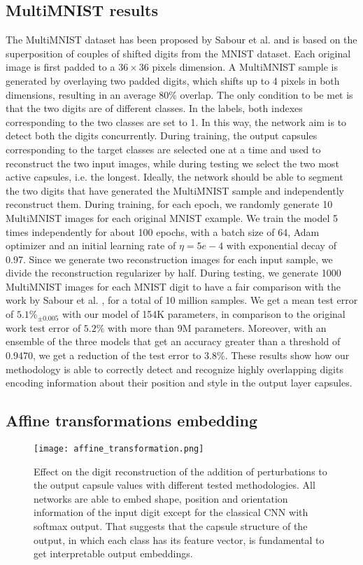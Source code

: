 \documentclass{article}
\begin{document}
\subsection{MultiMNIST results}
The MultiMNIST dataset has been proposed by Sabour et al. \cite{sabour2017dynamic} and is based on the superposition of couples of shifted digits from the MNIST dataset. Each original image is first padded to a $36 \times 36$ pixels dimension. A MultiMNIST sample is generated by overlaying two padded digits, which shifts up to 4 pixels in both dimensions, resulting in an average 80\% overlap. The only condition to be met is that the two digits are of different classes. In the labels, both indexes corresponding to the two classes are set to 1. In this way, the network aim is to detect both the digits concurrently. During training, the output capsules corresponding to the target classes are selected one at a time and used to reconstruct the two input images, while during testing we select the two most active capsules, i.e. the longest. Ideally, the network should be able to segment the two digits that have generated the MultiMNIST sample and independently reconstruct them. During training, for each epoch, we randomly generate 10 MultiMNIST images for each original MNIST example. We train the model 5 times independently for about 100 epochs, with a batch size of 64, Adam optimizer and an initial learning rate of $\eta=5e-4$ with exponential decay of 0.97. Since we generate two reconstruction images for each input sample, we divide the reconstruction regularizer by half. During testing, we generate 1000 MultiMNIST images for each MNIST digit to have a fair comparison with the work by Sabour et al. \cite{sabour2017dynamic}, for a total of 10 million samples. We get a mean test error of $5.1\%_{\pm 0.005}$ with our model of 154K parameters, in comparison to the original work test error of $5.2\%$ with more than 9M parameters. Moreover, with an ensemble of the three models that get an accuracy greater than a threshold of 0.9470, we get a reduction of the test error to 3.8\%. These results show how our methodology is able to correctly detect and recognize highly overlapping digits encoding information about their position and style in the output layer capsules.


\subsection{Affine transformations embedding}
\begin{figure}[t]
    \centering
    \texttt{[image: affine\_transformation.png]}
    \caption{Effect on the digit reconstruction of the addition of perturbations to the output capsule values with different tested methodologies. All networks are able to embed shape, position and orientation information of the input digit except for the classical CNN with softmax output. That suggests that the capsule structure of the output, in which each class has its feature vector, is fundamental to get interpretable output embeddings.}
    \label{fig:affine_transformation}
\end{figure}
\end{document}
